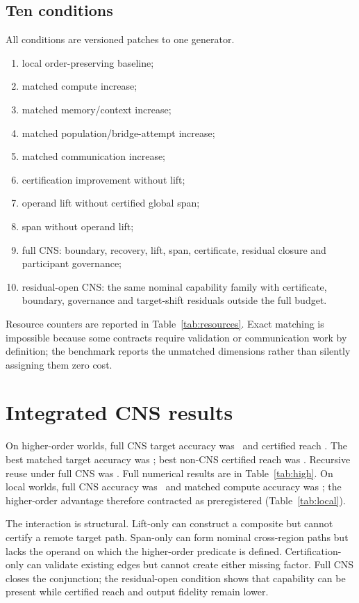 \documentclass[10pt]{article}
\begin{document}
\subsection{Ten conditions}
All conditions are versioned patches to one generator.
\begin{enumerate}
\item local order-preserving baseline;
\item matched compute increase;
\item matched memory/context increase;
\item matched population/bridge-attempt increase;
\item matched communication increase;
\item certification improvement without lift;
\item operand lift without certified global span;
\item span without operand lift;
\item full CNS: boundary, recovery, lift, span, certificate, residual closure and participant governance;
\item residual-open CNS: the same nominal capability family with certificate, boundary, governance and target-shift residuals outside the full budget.
\end{enumerate}
Resource counters are reported in Table~\ref{tab:resources}. Exact matching is impossible because some contracts require validation or communication work by definition; the benchmark reports the unmatched dimensions rather than silently assigning them zero cost.

\section{Integrated CNS results}
On higher-order worlds, full CNS target accuracy was \FullHighAcc\ and certified reach \FullHighReach. The best matched target accuracy was \BestHighAcc; best non-CNS certified reach was \BestHighReach. Recursive reuse under full CNS was \FullReuse. Full numerical results are in Table~\ref{tab:high}. On local worlds, full CNS accuracy was \FullLocalAcc\ and matched compute accuracy was \BestLocalAcc; the higher-order advantage therefore contracted as preregistered (Table~\ref{tab:local}).

The interaction is structural. Lift-only can construct a composite but cannot certify a remote target path. Span-only can form nominal cross-region paths but lacks the operand on which the higher-order predicate is defined. Certification-only can validate existing edges but cannot create either missing factor. Full CNS closes the conjunction; the residual-open condition shows that capability can be present while certified reach and output fidelity remain lower.
\end{document}
